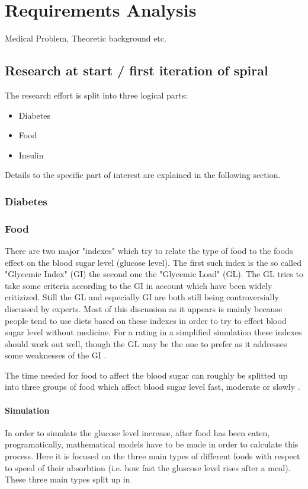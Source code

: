\section{Requirements Analysis}
Medical Problem, Theoretic background etc.

\subsection{Research at start / first iteration of spiral}
The research effort is split into three logical parts:
\begin{itemize}
  \item Diabetes
  \item Food
  \item Insulin
\end{itemize}
Details to the specific part of interest are explained in the following section.

\subsubsection{Diabetes}

\subsubsection{Food}
There are two major "indexes" which try to relate the type of food to the foods effect on the blood sugar level (glucose level).
The first such index is the so called "Glycemic Index" (GI) the second one the "Glycemic Load" (GL).
The GL tries to take some criteria according to the GI in account which have been widely critizized.
Still the GL and especially GI are both still being controversially discussed by experts.
Most of this discussion as it appears is mainly because people tend to use
diets based on these indexes in order to try to effect blood sugar level
without medicine. For a rating in a simplified simulation these indexes should
work out well, though the GL may be the one to prefer as it addresses some
weaknesses of the GI \cite{norden:glycemicindex}.

The time needed for food to affect the blood sugar can roughly be splitted up
into three groups of food which affect blood sugar level fast, moderate or
slowly \cite{mit:glycemicindex}.

\paragraph{Simulation}
In order to simulate the glucose level increase, after food has been eaten, programatically, mathematical models have to be made in order to calculate this process.
Here it is focused on the three main types of different foods with respect to speed of their absorbtion (i.e. how fast the gluscose level rises after a meal).
These three main types split up in

